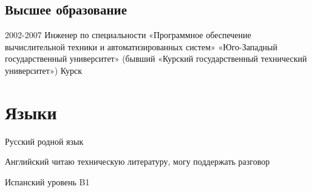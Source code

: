 \documentclass[11pt,a4paper,sans]{moderncv}
\newcommand{\lang}[2]{#1}
\begin{document}
\subsection
    {\lang
        {Высшее образование}
        {Higher Education}}

\cventry
    {2002-2007}
    {\lang
        {Инженер по специальности «Программное обеспечение вычислительной техники и автоматизированных систем»}
        {Software of computer facilities and automated systems}}
    {\lang
        {«Юго-Западный государственный университет» (бывший «Курский государственный технический университет»)}
        {South-West State University (ex. Kursk State Technical University)}}
    {\lang
        {Курск}
        {Kursk}}
    {}
    {}

\section
    {\lang
        {Языки}
        {Language Skills}}

\cvlanguage
    {\lang
        {Русский}
        {Russian}}
    {\lang
        {родной язык}
        {Native speaker}}
    {}

\cvlanguage
    {\lang
        {Английский}
        {English}}
    {\lang
        {читаю техническую литературу, могу поддержать разговор}
        {Good reading and translating ability}}
    {}

\cvlanguage
    {\lang
        {Испанский}
        {Spanish}}
    {\lang
        {уровень B1}
        {Nivel B1}}
    {}
\end{document}
